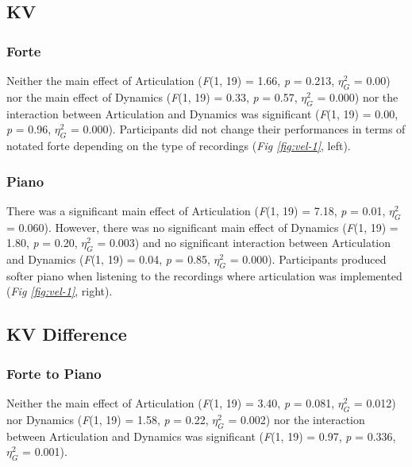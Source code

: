 \documentclass[
  man,floatsintext]{apa6}
\begin{document}
\hypertarget{kv}{%
\subsection{KV}\label{kv}}

\hypertarget{forte}{%
\subsubsection{Forte}\label{forte}}

Neither the main effect of Articulation (\emph{F}(1, 19) = 1.66, \emph{p} = 0.213, \(\eta_G^2\) = 0.00) nor the main effect of Dynamics (\emph{F}(1, 19) = 0.33, \emph{p} = 0.57, \(\eta_G^2\) = 0.000) nor the interaction between Articulation and Dynamics was significant (\emph{F}(1, 19) = 0.00, \emph{p} = 0.96, \(\eta_G^2\) = 0.000). Participants did not change their performances in terms of notated forte depending on the type of recordings (\emph{Fig \ref{fig:vel-1}}, left).

\hypertarget{piano}{%
\subsubsection{Piano}\label{piano}}

There was a significant main effect of Articulation (\emph{F}(1, 19) = 7.18, \emph{p} = 0.01, \(\eta_G^2\) = 0.060). However, there was no significant main effect of Dynamics (\emph{F}(1, 19) = 1.80, \emph{p} = 0.20, \(\eta_G^2\) = 0.003) and no significant interaction between Articulation and Dynamics (\emph{F}(1, 19) = 0.04, \emph{p} = 0.85, \(\eta_G^2\) = 0.000). Participants produced softer piano when listening to the recordings where articulation was implemented (\emph{Fig \ref{fig:vel-1}}, right).

\hypertarget{kv-difference}{%
\subsection{KV Difference}\label{kv-difference}}

\hypertarget{forte-to-piano}{%
\subsubsection{Forte to Piano}\label{forte-to-piano}}

Neither the main effect of Articulation (\emph{F}(1, 19) = 3.40, \emph{p} = 0.081, \(\eta_G^2\) = 0.012) nor Dynamics (\emph{F}(1, 19) = 1.58, \emph{p} = 0.22, \(\eta_G^2\) = 0.002) nor the interaction between Articulation and Dynamics was significant (\emph{F}(1, 19) = 0.97, \emph{p} = 0.336, \(\eta_G^2\) = 0.001).
\end{document}
